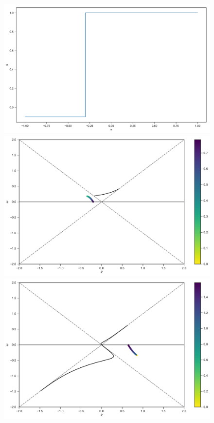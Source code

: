 \documentclass[%
preprint,
 amsmath,amssymb,
 aps,
 prd
]{revtex4-1}
\begin{document}
\begin{figure}
     \includegraphics[width=\linewidth]{assets/spectBoxC1Spectrum.pdf}
   \endminipage\hfill
   \includegraphics[width=\linewidth]{assets/spectBoxC1MAADRPlt.pdf}
   \endminipage\hfill
   \includegraphics[width=\linewidth]{assets/spectBoxC1MZApDRPlt.pdf}

\end{figure}
\end{document}

